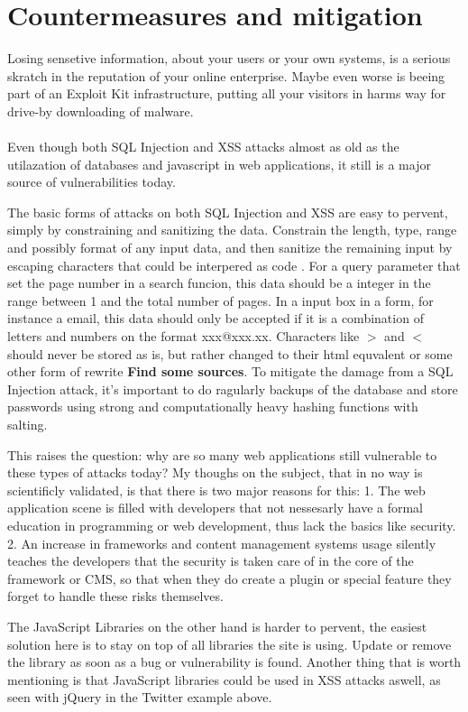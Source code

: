 \section{Countermeasures and mitigation}
Losing sensetive information, about your users or your own systems, is a serious skratch in the reputation of your online enterprise. Maybe even worse is beeing part of an Exploit Kit infrastructure, putting all your visitors in harms way for drive-by downloading of malware. 
\\ \\
Even though both SQL Injection and XSS attacks almost as old as the utilazation of databases and javascript in web applications, it still is a major source of vulnerabilities today. 

The basic forms of attacks on both SQL Injection and XSS are easy to pervent, simply by constraining and sanitizing the data. Constrain the length, type, range and possibly format of any input data, and then sanitize the remaining input by escaping characters that could be interpered as code \cite{Bisson2005}. For a query parameter that set the page number in a search funcion, this data should be a integer in the range between 1 and the total number of pages. In a input box in a form, for instance a email, this data should only be accepted if it is a combination of letters and numbers on the format xxx@xxx.xx. Characters like $>$ and $<$ should never be stored as is, but rather changed to their html equvalent or some other form of rewrite   \textbf{Find some sources}. To mitigate the damage from a SQL Injection attack, it's important to do ragularly backups of the database and store passwords using strong and computationally heavy hashing functions with salting.  

This raises the question: why are so many web applications still vulnerable to these types of attacks today? My thoughs on the subject, that in no way is scientificly validated, is that there is two major reasons for this: 1. The web application scene is filled with developers that not nessesarly have a formal education in programming or web development, thus lack the basics like security. 2. An increase in frameworks and content management systems usage silently teaches the developers that the security is taken care of in the core of the framework or CMS, so that when they do create a plugin or special feature they forget to handle these risks themselves.

The JavaScript Libraries on the other hand is harder to pervent, the easiest solution here is to stay on top of all libraries the site is using. Update or remove the library as soon as a bug or vulnerability is found. Another thing that is worth mentioning is that JavaScript libraries could be used in XSS attacks aswell, as seen with jQuery in the Twitter example above.



